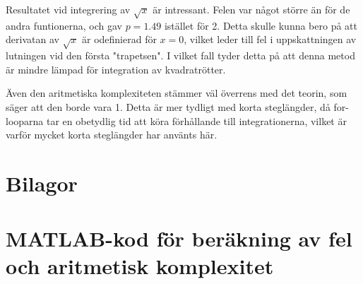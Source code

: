 \documentclass[a4paper,titlepage]{article}
\begin{document}
Resultatet vid integrering av $\sqrt x$ är intressant. Felen var något större än för
de andra funtionerna, och gav $p = 1.49$ istället för 2. Detta
skulle kunna bero på att derivatan av $\sqrt x$ är odefinierad för $x = 0$, vilket
leder till fel i uppskattningen av lutningen vid den första "trapetsen". I vilket fall
tyder detta på att denna metod är mindre lämpad för integration av kvadratrötter.

Även den aritmetiska komplexiteten stämmer väl överrens med det teorin, som säger att
den borde vara 1. Detta är mer tydligt med korta steglängder, då
for-looparna tar en obetydlig tid att köra förhållande till integrationerna,
vilket är varför mycket korta steglängder har använts här.


\section*{Bilagor}
\appendix

\section{MATLAB-kod för beräkning av fel och aritmetisk komplexitet}
\label{sec:testcode}

\end{document}

